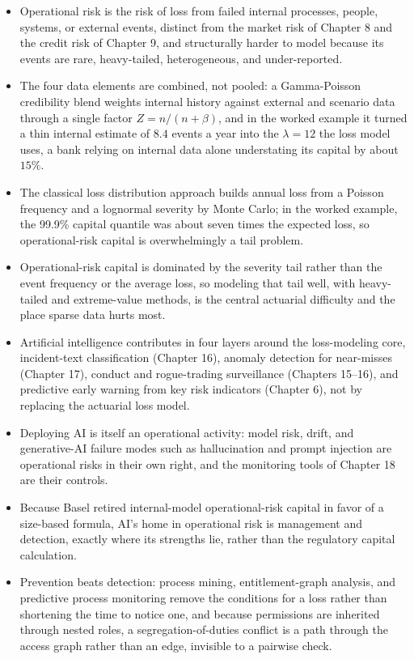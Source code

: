 \documentclass[../ai_in_finance]{subfiles}
\begin{document}
\begin{itemize}
\item Operational risk is the risk of loss from failed internal processes, people, systems, or external events, distinct from the market risk of Chapter 8 and the credit risk of Chapter 9, and structurally harder to model because its events are rare, heavy-tailed, heterogeneous, and under-reported.
\item The four data elements are combined, not pooled: a Gamma-Poisson credibility blend weights internal history against external and scenario data through a single factor $Z=n/(n+\beta)$, and in the worked example it turned a thin internal estimate of $8.4$ events a year into the $\lambda=12$ the loss model uses, a bank relying on internal data alone understating its capital by about $15\%$.
\item The classical loss distribution approach builds annual loss from a Poisson frequency and a lognormal severity by Monte Carlo; in the worked example, the 99.9\% capital quantile was about seven times the expected loss, so operational-risk capital is overwhelmingly a tail problem.
\item Operational-risk capital is dominated by the severity tail rather than the event frequency or the average loss, so modeling that tail well, with heavy-tailed and extreme-value methods, is the central actuarial difficulty and the place sparse data hurts most.
\item Artificial intelligence contributes in four layers around the loss-modeling core, incident-text classification (Chapter 16), anomaly detection for near-misses (Chapter 17), conduct and rogue-trading surveillance (Chapters 15--16), and predictive early warning from key risk indicators (Chapter 6), not by replacing the actuarial loss model.
\item Deploying AI is itself an operational activity: model risk, drift, and generative-AI failure modes such as hallucination and prompt injection are operational risks in their own right, and the monitoring tools of Chapter 18 are their controls.
\item Because Basel retired internal-model operational-risk capital in favor of a size-based formula, AI's home in operational risk is management and detection, exactly where its strengths lie, rather than the regulatory capital calculation.
\item Prevention beats detection: process mining, entitlement-graph analysis, and predictive process monitoring remove the conditions for a loss rather than shortening the time to notice one, and because permissions are inherited through nested roles, a segregation-of-duties conflict is a path through the access graph rather than an edge, invisible to a pairwise check.

\end{itemize}
\end{document}
